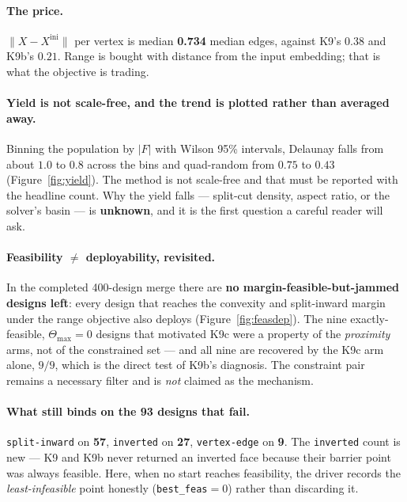 \documentclass[11pt,a4paper]{article}
\theoremstyle{definition}
\newcommand{\Tmax}{\Theta_{\max}}
\newcommand{\file}[1]{\texttt{\small #1}}
\begin{document}
\paragraph{The price.} $\|X-X^{\mathrm{ini}}\|$ per vertex is median \textbf{0.734} median
edges, against K9's $0.38$ and K9b's $0.21$. Range is bought with distance from the input
embedding; that is what the objective is trading.

\paragraph{Yield is not scale-free, and the trend is plotted rather than averaged away.}
Binning the population by $|F|$ with Wilson 95\% intervals, Delaunay falls from about $1.0$ to
$0.8$ across the bins and quad-random from $0.75$ to $0.43$ (Figure~\ref{fig:yield}). The
method is not scale-free and that must be reported with the headline count. Why the yield
falls --- split-cut density, aspect ratio, or the solver's basin --- is \textbf{unknown}, and
it is the first question a careful reader will ask.

\paragraph{Feasibility $\ne$ deployability, revisited.} In the completed 400-design merge there
are \textbf{no margin-feasible-but-jammed designs left}: every design that reaches the
convexity and split-inward margin under the range objective also deploys
(Figure~\ref{fig:feasdep}). The nine exactly-feasible, $\Tmax=0$ designs that motivated K9c
were a property of the \emph{proximity} arms, not of the constrained set --- and all nine are
recovered by the K9c arm alone, $9/9$, which is the direct test of K9b's diagnosis. The
constraint pair remains a necessary filter and is \emph{not} claimed as the mechanism.

\paragraph{What still binds on the 93 designs that fail.} \texttt{split-inward} on
\textbf{57}, \texttt{inverted} on \textbf{27}, \texttt{vertex-edge} on \textbf{9}. The
\texttt{inverted} count is new --- K9 and K9b never returned an inverted face because their
barrier point was always feasible. Here, when no start reaches feasibility, the driver records
the \emph{least-infeasible} point honestly (\file{best\_feas}$=0$) rather than discarding it.
\end{document}
